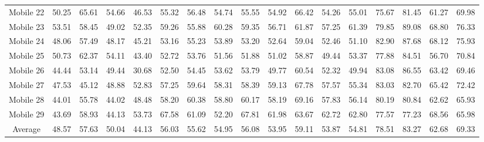 \documentclass[conference]{IEEEtran}
\begin{document}
\begin{table*}[t!]
\begin{tabular}{ |c|c c c c|c c c c|c c c c|c c c c|}
Mobile 22 & 50.25               & 65.61 & 54.66 & 46.53 & 55.32        & 56.48 & 54.74 & 55.55 & 54.92         & 66.42 & 54.26 & 55.01 & 75.67         & 81.45 & 61.27 & 69.98 \\
Mobile 23 & 53.51               & 58.45 & 49.02 & 52.35 & 59.26        & 55.88 & 60.28 & 59.35 & 56.71         & 61.87 & 57.25 & 61.39 & 79.85         & 89.08 & 68.80 & 76.33 \\
Mobile 24 & 48.06               & 57.49 & 48.17 & 45.21 & 53.16        & 55.23 & 53.89 & 53.20 & 52.64         & 59.04 & 52.46 & 51.10 & 82.90         & 87.68 & 68.12 & 75.93 \\
Mobile 25 & 50.73               & 62.37 & 54.11 & 43.40 & 52.72        & 53.76 & 51.56 & 51.88 & 51.02         & 58.87 & 49.44 & 53.37 & 77.88         & 84.51 & 56.70 & 70.84 \\
Mobile 26 & 44.44               & 53.14 & 49.44 & 30.68 & 52.50        & 54.45 & 53.62 & 53.79 & 49.77         & 60.54 & 52.32 & 49.94 & 83.08         & 86.55 & 63.42 & 69.46 \\
Mobile 27 & 47.53               & 45.12 & 48.88 & 52.83 & 57.25        & 59.64 & 58.31 & 58.39 & 59.13         & 67.78 & 57.57 & 55.34 & 83.03         & 82.70 & 65.42 & 72.42 \\
Mobile 28 & 44.01               & 55.78 & 44.02 & 48.48 & 58.20        & 60.38 & 58.80 & 60.17 & 58.19         & 69.16 & 57.83 & 56.14 & 80.19         & 80.84 & 62.62 & 65.93 \\
Mobile 29 & 43.69               & 58.93 & 44.13 & 53.73 & 67.58        & 61.09 & 52.20 & 67.81 & 61.98         & 63.67 & 62.72 & 62.80 & 77.57         & 77.23 & 68.56 & 65.98 \\
\hline 
Average   & 48.57               & 57.63 & 50.04 & 44.13 & 56.03        & 55.62 & 54.95 & 56.08 & 53.95         & 59.11 & 53.87 & 54.81 & \cellcolor{Gray} 78.51         & \cellcolor{Gray} 83.27 & \cellcolor{Gray} 62.68 & \cellcolor{Gray} 69.33\\
\hline
\end{tabular}
\end{table*}


\end{document}
